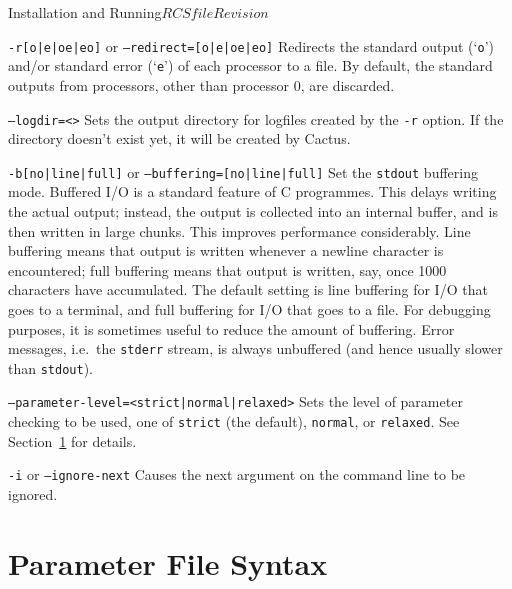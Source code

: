 \begin{cactuspart}{Installation and Running}{$RCSfile$}{$Revision$}
\begin{Lentry}
\item [\texttt{-r[o|e|oe|eo]} or \texttt{--redirect=[o|e|oe|eo]}]
Redirects the standard output (`\texttt{o}') and/or standard error
(`\texttt{e}') of each processor to a file.  By default,
the standard outputs from processors, other than processor 0, are discarded.

\item [\texttt{--logdir=<\var{directory}>}]
Sets the output directory for logfiles created by the \texttt{-r} option.
If the directory doesn't exist yet, it will be created by Cactus.

\item [\texttt{-b[no|line|full]} or \texttt{--buffering=[no|line|full]}]
  Set the \texttt{stdout} buffering mode.  Buffered I/O is a
  standard feature of C programmes.  This delays writing the actual
  output; instead, the output is collected into an internal buffer,
  and is then written in large chunks.  This improves performance
  considerably.  Line buffering means that output is written whenever
  a newline character is encountered; full buffering means that output
  is written, say, once 1000 characters have accumulated.  The default
  setting is line buffering for I/O that goes to a terminal, and full
  buffering for I/O that goes to a file.  For debugging purposes, it
  is sometimes useful to reduce the amount of buffering.  Error
  messages, i.e.\ the \texttt{stderr} stream, is always unbuffered
  (and hence usually slower than \texttt{stdout}).

\item [\texttt{--parameter-level=<strict|normal|relaxed>}]
Sets the level of parameter checking to be used, one of \texttt{strict}
(the default), \texttt{normal}, or \texttt{relaxed}.
See Section~\ref{sec:Parameter_File} for details.

\item [\texttt{-i} or \texttt{--ignore-next}]
Causes the next argument on the command line to be ignored.

\end{Lentry}


\section{Parameter File Syntax}
\label{sec:Parameter_File}


\end{cactuspart}
